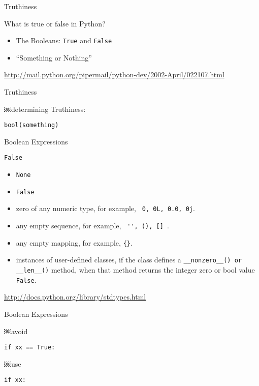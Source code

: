 \documentclass{beamer}
\begin{document}
\begin{frame}[fragile]{Truthiness}

{\Large What is true or false in Python?}

\begin{itemize}
  \item The Booleans: \verb+True+ and \verb+False+
  \item ``Something or Nothing''
\end{itemize}

{\small \url{http://mail.python.org/pipermail/python-dev/2002-April/022107.html} }

\end{frame}

\begin{frame}[fragile]{Truthiness}

{\Large ￼determining Truthiness:

\vfill
  \verb+bool(something)+
\vfill
}

\end{frame}

\begin{frame}[fragile]{Boolean Expressions}

{\Large \verb+False+ }

\begin{itemize}
  \item \verb+None+
  \item \verb+False+
  \item zero of any numeric type, for example, \verb+ 0, 0L, 0.0, 0j+.
  \item any empty sequence, for example, \verb+ '', (), [] +.
  \item any empty mapping, for example, \verb+{}+.
  \item instances of user-defined classes, if the class defines a
        \verb+__nonzero__() or __len__()+ method, when that method
        returns the integer zero or bool value \verb+False+.
\end{itemize}

\url{http://docs.python.org/library/stdtypes.html}

\end{frame}

\begin{frame}[fragile]{Boolean Expressions}

{ \Large￼avoid }

\vspace{0.25in}
\verb+if xx == True:+

\vspace{0.25in}
{ \Large￼use }

\vspace{0.25in}
\verb+if xx:+

\end{frame}
\end{document}
